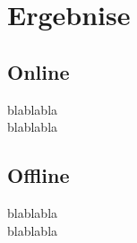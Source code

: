 
\chapter{Ergebnise} %
\label{cha:Ergebnise}

\section{Online} %
\label{sec:Online}
blablabla\\

blablabla


\section{Offline} %
\label{sec:Offline}
blablabla\\

blablabla


